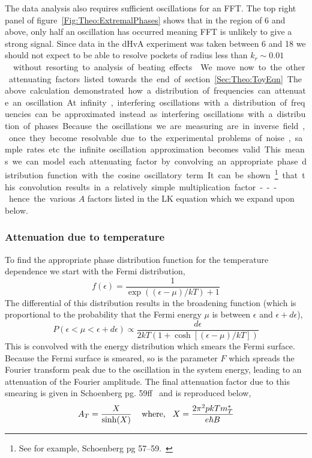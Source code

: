 The data analysis also requires sufficient oscillations for an \ac{FFT}. The top right panel of figure~\ref{Fig:Theo:ExtremalPhases} shows that in the region of \unit{6}{\tesla} and above, only half an oscillation has occurred meaning \ac{FFT} is unlikely to give a strong signal. Since data in the \ac{dHvA} experiment was taken between \unit{6}{\tesla} and \unit{18}{\tesla} we should not expect to be able to resolve pockets of radius less than \unit{$k_r\sim 0.01$}{\reciprocal\angstrom} without resorting to analysis of beating effects~\cite{Carrington2005}.

We move now to the other attenuating factors listed towards the end of section~\ref{Sec:Theo:ToyEqn}. The above calculation demonstrated how a distribution of frequencies can attenuate an oscillation. At infinity, interfering oscillations with a distribution of frequencies can be approximated instead as interfering oscillations with a distribution of phases. Because the oscillations we are measuring are in inverse field, once they become resolvable due to the experimental problems of noise, sample rates etc. the infinite oscillation approximation becomes valid. This means we can model each attenuating factor by convolving an appropriate phase distribution function with the cosine oscillatory term. It can be shown\footnote{See for example, Schoenberg pg 57--59.~\cite{Schoenberg1984}} that this convolution results in a relatively simple multiplication factor --- hence the various $A$ factors listed in the \ac{LK} equation which we expand upon below.

\subsubsection{Attenuation due to temperature}

To find the appropriate phase distribution function for the temperature dependence we start with the Fermi distribution,
\begin{equation}
\label{Eqn:Theo:FermiFunction}
f(\epsilon) = \frac{1}{\exp\left((\epsilon-\mu)/kT\right) + 1}
\end{equation} 
The differential of this distribution results in the broadening function (which is proportional to the probability that the Fermi energy $\mu$ is between $\epsilon$ and $\epsilon + d\epsilon$),
\begin{equation}
  P(\epsilon < \mu < \epsilon + d\epsilon) \propto \frac{d\epsilon}{2kT(1 + \cosh[(\epsilon - \mu)/kT])}
\end{equation}
This is convolved with the energy distribution which smears the Fermi surface. Because the Fermi surface is smeared, so is the parameter $F$ which spreads the Fourier transform peak due to the oscillation in the system energy, leading to an attenuation of the Fourier amplitude. The final attenuation factor due to this smearing is given in Schoenberg pg. 59ff~\cite{Schoenberg1984} and is reproduced below,
\begin{equation}
\label{Eqn:Theo:TemperatureTerm}
  A_T = \frac{X}{\sinh(X)} \textrm{\hspace{0.3cm} where,\hspace{0.3cm}} X = \frac{2\pi^2pkT m^*_T}{e\hbar B}
\end{equation}

